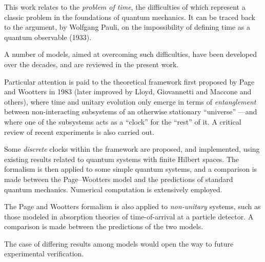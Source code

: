 This work relates to the
\emph{problem of time},
the difficulties of which
represent a classic problem in the foundations of quantum mechanics.
It can be traced back to
the argument, by Wolfgang Pauli,
on the impossibility of defining time as a quantum observable (1933).

A number of models, aimed at overcoming such difficulties,
have been developed over the decades,
and are reviewed in the present work.

Particular attention is paid to 
the theoretical framework first proposed by Page and Wootters in 1983
(later improved by Lloyd, Giovannetti and Maccone and others),
where time and unitary evolution only emerge in
terms of \emph{entanglement} between non-interacting subsystems
of an otherwise stationary ``universe''
---and where one of the subsystems acts as a ``clock'' for the ``rest'' of it.
A critical review
of recent experiments is also carried out.

Some \emph{discrete} clocks within the framework are proposed, and implemented,
using
existing results related to quantum systems with finite Hilbert spaces.
The formalism is then applied to some simple quantum systems,
and a comparison is made between the Page--Wootters model and the predictions
of standard quantum mechanics. 
Numerical computation is extensively employed.

The Page and Wootters formalism is also applied to \emph{non-unitary} systems,
such as those modeled in absorption theories of time-of-arrival at a particle detector.
A comparison is made between the predictions of the two models.

The case of differing results among models would open the way to future experimental verification.